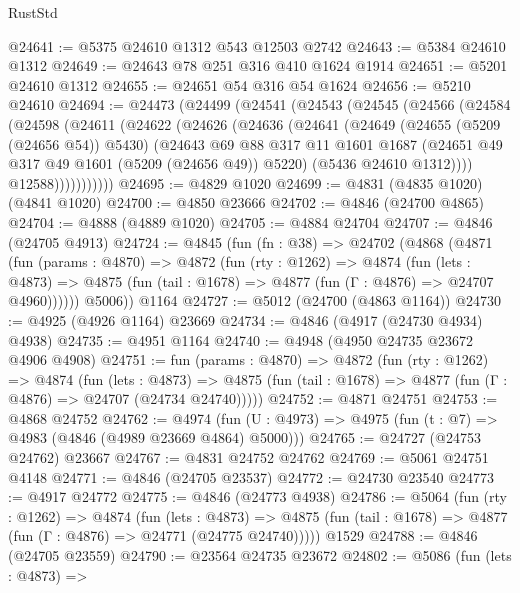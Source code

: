 \begin{lexlean}{RustStd}
\begin{coremodule}
@24641 := @5375 @24610 @1312 @543 @12503 @2742
@24643 := @5384 @24610 @1312
@24649 := @24643 @78 @251 @316 @410 @1624 @1914
@24651 := @5201 @24610 @1312
@24655 := @24651 @54 @316 @54 @1624
@24656 := @5210 @24610
@24694 := @24473
    (@24499
      (@24541
        (@24543
          (@24545
            (@24566
              (@24584
                (@24598
                  (@24611
                    (@24622
                      (@24626
                        (@24636
                          (@24641
                            (@24649
                              (@24655 (@5209 (@24656 @54)) @5430)
                              (@24643
                                @69
                                @88
                                @317
                                @11
                                @1601
                                @1687
                                (@24651 @49 @317 @49 @1601 (@5209 (@24656 @49)) @5220)
                                (@5436 @24610 @1312))))
                          @12588)))))))))))
@24695 := @4829 @1020
@24699 := @4831 (@4835 @1020) (@4841 @1020)
@24700 := @4850 @23666
@24702 := @4846 (@24700 @4865)
@24704 := @4888 (@4889 @1020)
@24705 := @4884 @24704
@24707 := @4846 (@24705 @4913)
@24724 := @4845
    (fun (fn : @38) =>
    @24702
      (@4868
        (@4871
          (fun (params : @4870) =>
          @4872
            (fun (rty : @1262) =>
            @4874
              (fun (lets : @4873) =>
              @4875 (fun (tail : @1678) => @4877 (fun (Γ : @4876) => @24707 @4960))))))
        @5006))
    @1164
@24727 := @5012 (@24700 (@4863 @1164))
@24730 := @4925 (@4926 @1164) @23669
@24734 := @4846 (@4917 (@24730 @4934) @4938)
@24735 := @4951 @1164
@24740 := @4948 (@4950 @24735 @23672 @4906 @4908)
@24751 := fun (params : @4870) =>
  @4872
    (fun (rty : @1262) =>
    @4874
      (fun (lets : @4873) =>
      @4875 (fun (tail : @1678) => @4877 (fun (Γ : @4876) => @24707 (@24734 @24740)))))
@24752 := @4871 @24751
@24753 := @4868 @24752
@24762 := @4974
    (fun (U : @4973) => @4975 (fun (t : @7) => @4983 (@4846 (@4989 @23669 @4864) @5000)))
@24765 := @24727 (@24753 @24762) @23667
@24767 := @4831 @24752 @24762
@24769 := @5061 @24751 @4148
@24771 := @4846 (@24705 @23537)
@24772 := @24730 @23540
@24773 := @4917 @24772
@24775 := @4846 (@24773 @4938)
@24786 := @5064
    (fun (rty : @1262) =>
    @4874
      (fun (lets : @4873) =>
      @4875 (fun (tail : @1678) => @4877 (fun (Γ : @4876) => @24771 (@24775 @24740)))))
    @1529
@24788 := @4846 (@24705 @23559)
@24790 := @23564 @24735 @23672
@24802 := @5086
    (fun (lets : @4873) =>

\end{coremodule}
\end{lexlean}
